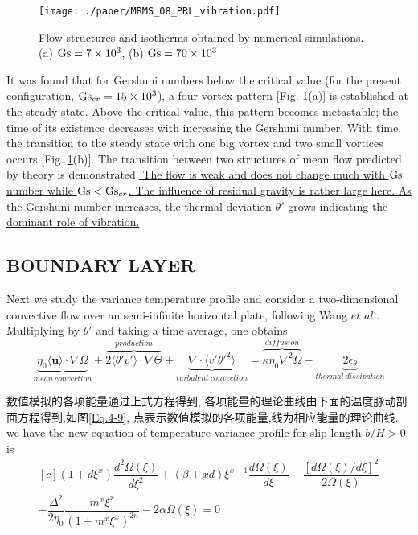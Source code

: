 \documentclass{hmj}
\newcommand\Gs{\mbox{\textrm{Gs}}} %
\begin{document}
\begin{figure}
  \centering
  \centering
  \texttt{[image: ./paper/MRMS\_08\_PRL\_vibration.pdf]}
  \renewcommand{\figurename}{Figure}
  \caption{Flow structures and isotherms obtained by numerical simulations. (a) $\Gs =7\times10^3$, (b) $\Gs=70\times10^3$}
  \renewcommand{\figurename}{图}
\label{fig3}
\end{figure}
It was found that for Gershuni numbers below the critical value (for the present configuration, $\Gs_{cr} =15\times 10^3$), a four-vortex pattern [Fig.  \ref{fig3}(a)] is established at the steady state. Above the critical value, this pattern becomes metastable; the time of its existence decreases with increasing the Gershuni number. With time, the transition to the steady state with one big vortex and two small vortices occurs [Fig. \ref{fig3}(b)]. The transition between two structures of mean flow predicted by theory is demonstrated.\ul{ The flow is weak and does not change much with $\Gs$ number while $\Gs < \Gs_{cr}$. The influence of residual gravity is rather large here. As the Gershuni number increases, the thermal deviation $\theta'$ grows indicating the dominant role of vibration.}

\subsection{BOUNDARY LAYER}
Next we study the variance temperature profile and consider a two-dimensional convective flow over an semi-infinite horizontal plate, following Wang $et$ $al.$\citep[]{Wang2016,Wang2018b}. Multiplying by $\theta'$ and taking a time average, one obtains
\begin{equation}
\underbrace{\eta_0\langle\boldsymbol{u}\rangle\cdot\nabla\Omega}_{mean\ convection} + \overbrace{2\langle \theta'v'\rangle\cdot\nabla\Theta}^{production} + \underbrace{\nabla\cdot\langle v'\theta'^2\rangle}_{turbulent\  convection}= \overbrace{\kappa\eta_0\nabla^2\Omega}^{diffusion} - \underbrace{2\epsilon _\theta}_{thermal\ dissipation}
  \label{Eq.4-1}
\end{equation}

数值模拟的各项能量通过上式方程得到, 各项能量的理论曲线由下面的温度脉动剖面方程得到,如图\ref{Eq.4-9}, 点表示数值模拟的各项能量,线为相应能量的理论曲线. we have the new equation of temperature variance profile for slip length $b/H >0$ is
\begin{equation}
\begin{aligned}[c]
  (1+d\xi^x)\dfrac{d^2\Omega(\xi)}{d\xi^2}+(\beta+xd)\xi^{x-1}\dfrac{d\Omega(\xi)}{d\xi}
    -\dfrac{[d\Omega(\xi)/d\xi]^2}{2\Omega(\xi)}\\
  +\dfrac{\Delta^2}{2\eta_0}\dfrac{m^x\xi^x}{(1+m^x\xi^x)^{2n}}
-2\alpha\Omega(\xi)=0
  \label{Eq.4-9}
  \end{aligned}
\end{equation}
\end{document}
